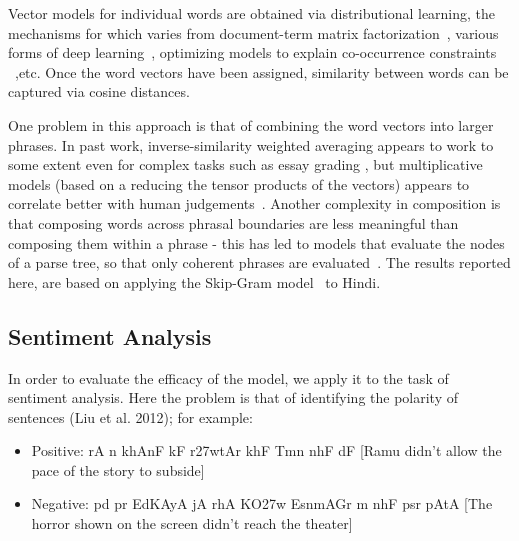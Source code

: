 \def\DevnagVersion{2.15}\documentclass[11pt]{article}
\begin{document}
Vector models for individual words are obtained via distributional learning, the
mechanisms for which varies from document-term
matrix factorization~\cite{Landauer:97},
various forms of deep learning~\cite{Collobert:08,Turian:10,Socher:13}, 
optimizing models to explain co-occurrence constraints
~\cite{Mikolov:13a,Pennington:14},etc. Once the word vectors have been assigned, similarity between words can
be captured via cosine distances. 

One problem in this approach is that of 
combining the word vectors into larger phrases.  In past work,
inverse-similarity weighted averaging appears
to work to some extent even for complex tasks such as essay grading \cite{Landauer:03},
but multiplicative models (based on a reducing the tensor products of the
vectors) appears to correlate better with human
judgements~\cite{Mitchell:08,Socher:13}.
Another complexity in composition is that composing words across phrasal
boundaries are less meaningful than composing them within a phrase - this has
led to models that evaluate the nodes of a parse tree, so that only coherent
phrases are
evaluated~\cite{Socher:13}. 
The results reported here, are based on applying the Skip-Gram  model~\cite{Mikolov:13b} to Hindi. 

\subsection{Sentiment Analysis}

In order to evaluate the efficacy of the model, we apply it to the task of
sentiment analysis.
Here the problem is that of identifying the polarity of sentences (Liu et
al. 2012); for example: 
\begin{itemize}
\item Positive: {\dn rA n\? khAnF kF r\327wtAr khF{\qva} Tmn\? nhF{\qva} dF} [Ramu didn't allow the pace of the story to subside]
\item Negative: {\dn pd\?{\qvb} pr EdKAyA jA rhA KO\327w Esn\?mAGr m\?
nhF{\qva} psr pAtA} [The horror shown on the screen didn't reach the theater]
\end{itemize}
\end{document}

